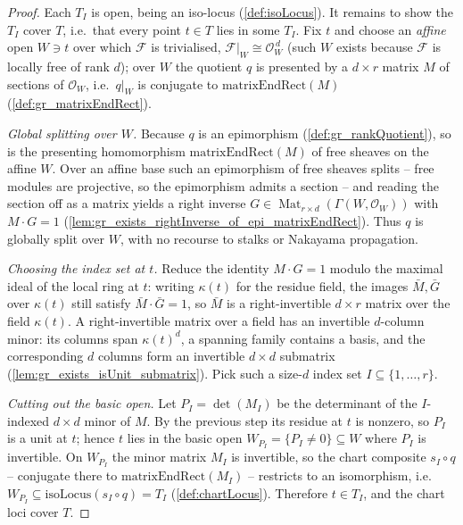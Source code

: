 \begin{proof}
  Each \(T_I\) is open, being an iso-locus (\cref{def:isoLocus}). It remains to show the
  \(T_I\) cover \(T\), i.e.\ that every point \(t \in T\) lies in some \(T_I\). Fix \(t\) and
  choose an \emph{affine} open \(W \ni t\) over which \(\mathcal{F}\) is trivialised,
  \(\mathcal{F}|_W \cong \mathcal{O}_W^{\,d}\) (such \(W\) exists because \(\mathcal{F}\) is
  locally free of rank \(d\)); over \(W\) the quotient \(q\) is presented by a \(d \times r\)
  matrix \(M\) of sections of \(\mathcal{O}_W\), i.e.\ \(q|_W\) is conjugate to
  \(\mathrm{matrixEndRect}(M)\) (\cref{def:gr_matrixEndRect}).

  \emph{Global splitting over \(W\).} Because \(q\) is an epimorphism
  (\cref{def:gr_rankQuotient}), so is the presenting homomorphism
  \(\mathrm{matrixEndRect}(M)\) of free sheaves on the affine \(W\). Over an affine base such
  an epimorphism of free sheaves splits -- free modules are projective, so the epimorphism
  admits a section -- and reading the section off as a matrix yields a right inverse
  \(G \in \operatorname{Mat}_{r\times d}(\Gamma(W,\mathcal{O}_W))\) with \(M \cdot G = 1\)
  (\cref{lem:gr_exists_rightInverse_of_epi_matrixEndRect}). Thus \(q\) is globally split over
  \(W\), with no recourse to stalks or Nakayama propagation.

  \emph{Choosing the index set at \(t\).} Reduce the identity \(M \cdot G = 1\) modulo the
  maximal ideal of the local ring at \(t\): writing \(\kappa(t)\) for the residue field, the
  images \(\bar M, \bar G\) over \(\kappa(t)\) still satisfy \(\bar M \cdot \bar G = 1\), so
  \(\bar M\) is a right-invertible \(d \times r\) matrix over the field \(\kappa(t)\). A
  right-invertible matrix over a field has an invertible \(d\)-column minor: its columns span
  \(\kappa(t)^{d}\), a spanning family contains a basis, and the corresponding \(d\) columns
  form an invertible \(d \times d\) submatrix (\cref{lem:gr_exists_isUnit_submatrix}). Pick
  such a size-\(d\) index set \(I \subseteq \{1,\dots,r\}\).

  \emph{Cutting out the basic open.} Let \(P_I = \det(M_I)\) be the determinant of the
  \(I\)-indexed \(d \times d\) minor of \(M\). By the previous step its residue at \(t\) is
  nonzero, so \(P_I\) is a unit at \(t\); hence \(t\) lies in the basic open
  \(W_{P_I} = \{P_I \ne 0\} \subseteq W\) where \(P_I\) is invertible. On \(W_{P_I}\) the
  minor matrix \(M_I\) is invertible, so the chart composite \(s_I \circ q\) -- conjugate
  there to \(\mathrm{matrixEndRect}(M_I)\) -- restricts to an isomorphism, i.e.\
  \(W_{P_I} \subseteq \mathrm{isoLocus}(s_I \circ q) = T_I\) (\cref{def:chartLocus}).
  Therefore \(t \in T_I\), and the chart loci cover \(T\).
\end{proof}

